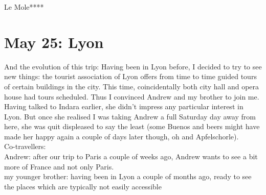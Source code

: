 Le Mole****

\section{May 25: Lyon}
\label{Lyon2013}

And the evolution of this trip: Having been in Lyon before, I decided to try to see new things: the tourist association of Lyon offers from time to time guided tours of certain buildings in the city. This time, coincidentally both city hall and opera house had tours scheduled. Thus I convinced Andrew and my brother to join me. Having talked to Indara earlier, she didn't impress any particular interest in Lyon. But once she realised I was taking Andrew a full Saturday day away from here, she was quit displeased to say the least (some Buenos and beers might have made her happy again a couple of days later though, oh and Apfelschorle).\\

Co-travellers:\\
Andrew: after our trip to Paris a couple of weeks ago, Andrew wants to see a bit more of France and not only Paris.\\

my younger brother: having been in Lyon a couple of months ago, ready to see the places which are typically not easily accessible\\

